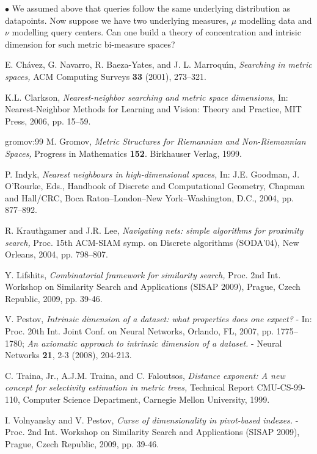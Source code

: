 \documentclass[12pt]{article}
\begin{document}
\noindent
$\bullet$
We assumed above that queries follow the same underlying distribution as datapoints. Now suppose we have two underlying measures, $\mu$ modelling data and $\nu$ modelling query centers. Can one build a theory of concentration and intrisic dimension for such metric bi-measure spaces?

\begin{thebibliography}{1}

E. Ch\'avez, G. Navarro, R. Baeza-Yates, and J. L. Marroqu\'\i n,
{\em Searching in metric spaces,} ACM Computing Surveys \textbf{33} (2001), 273--321.

K.L. Clarkson, {\em Nearest-neighbor searching and metric space dimensions,}
In: Nearest-Neighbor Methods for Learning and Vision: Theory and Practice, MIT Press, 2006, pp. 15--59.

\bibitem 
{gromov:99} 
M. Gromov, {\em Metric Structures for Riemannian and
Non-Riemannian Spaces,} Progress in Mathematics \textbf{152}. Birkhauser
Verlag, 1999.

P. Indyk, {\em Nearest neighbours in high-dimensional spaces,}
In: J.E. Goodman, J. O'Rourke, Eds.,
Handbook of Discrete and Computational Geometry, Chapman and Hall/CRC, Boca Raton--London--New York--Washington, D.C.,
2004, pp. 877--892.

 R. Krauthgamer and J.R. Lee, {\em Navigating nets: simple algorithms for proximity search,} Proc. 15th ACM-SIAM symp. on Discrete algorithms (SODA'04), New Orleans, 2004, pp. 798--807.

Y. Lifshits, {\em Combinatorial framework for similarity search,} Proc. 2nd Int. Workshop on Similarity Search and Applications (SISAP 2009), Prague, Czech Republic, 2009, pp. 39-46. 

 V. Pestov, {\em Intrinsic dimension of a dataset: what properties does one expect?} - In: Proc. 20th Int. Joint Conf. on Neural Networks, Orlando, FL, 2007, pp. 1775--1780; {\em An axiomatic approach to intrinsic dimension of a dataset.} - Neural Networks \textbf{21}, 2-3 (2008), 204-213.

C. Traina, Jr., A.J.M. Traina, and C. Faloutsos,
{\em Distance exponent: A new concept for selectivity estimation in metric
trees,} 
Technical Report CMU-CS-99-110, Computer Science Department, 
Carnegie Mellon University, 1999.

 I. Volnyansky and V. Pestov, {\em Curse of dimensionality in pivot-based indexes.} - Proc. 2nd Int. Workshop on Similarity Search and Applications (SISAP 2009), Prague, Czech Republic, 2009,
pp. 39-46. 

\end{thebibliography}
\end{document}
